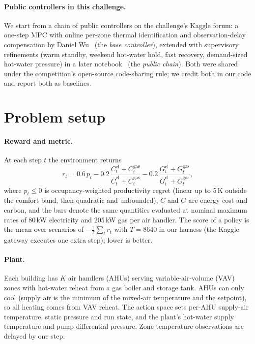 \documentclass{article}
\begin{document}
\paragraph{Public controllers in this challenge.} We start from a chain of public controllers on the challenge's Kaggle forum: a one-step MPC with online per-zone thermal identification and observation-delay compensation by Daniel Wu~\citep{wu2026cpu} (the \emph{base controller}), extended with supervisory refinements (warm standby, weekend hot-water hold, fast recovery, demand-sized hot-water pressure) in a later notebook~\citep{penguin2026} (the \emph{public chain}). Both were shared under the competition's open-source code-sharing rule; we credit both in our code and report both as baselines.

\section{Problem setup}

\paragraph{Reward and metric.} At each step $t$ the environment returns
\begin{equation}
  r_t = 0.6\,p_t - 0.2\,\frac{C^{\mathrm{el}}_t + C^{\mathrm{gas}}_t}{\bar C^{\mathrm{el}}_t + \bar C^{\mathrm{gas}}_t} - 0.2\,\frac{G^{\mathrm{el}}_t + G^{\mathrm{gas}}_t}{\bar G^{\mathrm{el}}_t + \bar G^{\mathrm{gas}}_t},
\end{equation}
where $p_t \le 0$ is occupancy-weighted productivity regret (linear up to 5\,K outside the comfort band, then quadratic and unbounded), $C$ and $G$ are energy cost and carbon, and the bars denote the same quantities evaluated at nominal maximum rates of 80\,kW electricity and 205\,kW gas per air handler. The score of a policy is the mean over scenarios of $-\frac{1}{T}\sum_t r_t$ with $T=8640$ in our harness (the Kaggle gateway executes one extra step); lower is better.

\paragraph{Plant.} Each building has $K$ air handlers (AHUs) serving variable-air-volume (VAV) zones with hot-water reheat from a gas boiler and storage tank. AHUs can only cool (supply air is the minimum of the mixed-air temperature and the setpoint), so all heating comes from VAV reheat. The action space sets per-AHU supply-air temperature, static pressure and run state, and the plant's hot-water supply temperature and pump differential pressure. Zone temperature observations are delayed by one step.
\end{document}
